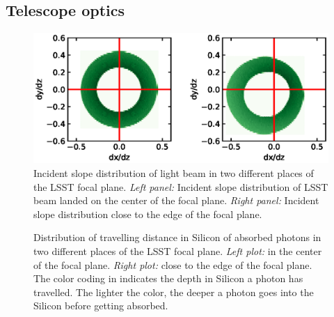 \documentclass[twocolumn]{aastex63} %
\begin{document}
\begin{CJK*}{UTF8}{gbsn}
\subsection{Telescope optics} \label{sec:LSST optic}

\begin{figure}[t]
\centering
\includegraphics[scale = 0.55]{batoid_angle_dists.eps}
\caption{Incident slope distribution of light beam in two different places of the LSST focal plane. {\it Left panel:} Incident slope distribution of LSST beam landed on the center of the focal plane. {\it Right panel:} Incident slope distribution close to the edge of the focal plane.}
\label{fig:batoid-angle-dist}
\end{figure}

\begin{figure}[thb]
\centering
{}
\caption{Distribution of travelling distance in Silicon of absorbed photons in two different places of the LSST focal plane. {\it Left plot:} in the center of the focal plane. {\it Right plot:} close to the edge of the focal plane. The color coding in indicates the depth in Silicon a photon has travelled. The lighter the color, the deeper a photon goes into the Silicon before getting absorbed.}
\label{fig:ab_pho_dist}
\end{figure}


\end{CJK*}
\end{document}

